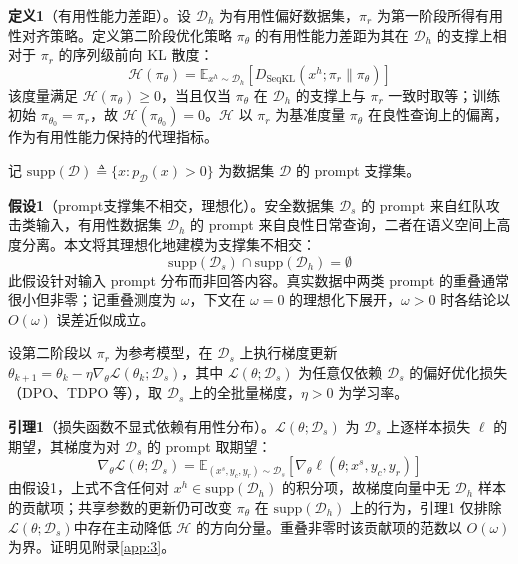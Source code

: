 \documentclass[lettersize,journal]{IEEEtran}
\begin{document}
\textbf{定义1}（有用性能力差距）。设 $\mathcal{D}_h$ 为有用性偏好数据集，$\pi_r$ 为第一阶段所得有用性对齐策略。定义第二阶段优化策略 $\pi_\theta$ 的有用性能力差距为其在 $\mathcal{D}_h$ 的支撑上相对于 $\pi_r$ 的序列级前向 KL 散度：
\begin{equation}
    \mathcal{H}(\pi_\theta) = \mathbb{E}_{x^h \sim \mathcal{D}_h}
    \left[ D_{\mathrm{SeqKL}}\left(x^h; \pi_r \| \pi_\theta \right) \right]
\end{equation}
该度量满足 $\mathcal{H}(\pi_\theta) \geq 0$，当且仅当 $\pi_\theta$ 在 $\mathcal{D}_h$ 的支撑上与 $\pi_r$ 一致时取等；训练初始 $\pi_{\theta_0} = \pi_r$，故 $\mathcal{H}(\pi_{\theta_0}) = 0$。$\mathcal{H}$ 以 $\pi_r$ 为基准度量 $\pi_\theta$ 在良性查询上的偏离，作为有用性能力保持的代理指标。

记 $\mathrm{supp}(\mathcal{D}) \triangleq \{x : p_\mathcal{D}(x) > 0\}$ 为数据集 $\mathcal{D}$ 的 prompt 支撑集。

\textbf{假设1}\label{jiashe1}（prompt支撑集不相交，理想化）。安全数据集 $\mathcal{D}_s$ 的 prompt 来自红队攻击类输入，有用性数据集 $\mathcal{D}_h$ 的 prompt 来自良性日常查询，二者在语义空间上高度分离。本文将其理想化地建模为支撑集不相交：
\begin{equation}
    \mathrm{supp}(\mathcal{D}_s) \cap \mathrm{supp}(\mathcal{D}_h) = \emptyset
\end{equation}
此假设针对输入 prompt 分布而非回答内容。真实数据中两类 prompt 的重叠通常很小但非零；记重叠测度为 $\omega$，下文在 $\omega = 0$ 的理想化下展开，$\omega > 0$ 时各结论以 $O(\omega)$ 误差近似成立。

设第二阶段以 $\pi_r$ 为参考模型，在 $\mathcal{D}_s$ 上执行梯度更新 $\theta_{k+1} = \theta_k - \eta \nabla_\theta \mathcal{L}(\theta_k; \mathcal{D}_s)$，其中 $\mathcal{L}(\theta; \mathcal{D}_s)$ 为任意仅依赖 $\mathcal{D}_s$ 的偏好优化损失（DPO、TDPO 等），取 $\mathcal{D}_s$ 上的全批量梯度，$\eta > 0$ 为学习率。

\textbf{引理1}\label{gradient1}（损失函数不显式依赖有用性分布）。$\mathcal{L}(\theta; \mathcal{D}_s)$ 为 $\mathcal{D}_s$ 上逐样本损失 $\ell$ 的期望，其梯度为对 $\mathcal{D}_s$ 的 prompt 取期望：
\begin{equation}
    \nabla_\theta \mathcal{L}(\theta; \mathcal{D}_s) = 
    \mathbb{E}_{(x^s, y_c, y_r) \sim \mathcal{D}_s}
    \left[\nabla_\theta \ell\left(\theta; x^s, y_c, y_r\right)\right]
\end{equation}
由假设1，上式不含任何对 $x^h \in \mathrm{supp}(\mathcal{D}_h)$ 的积分项，故梯度向量中无 $\mathcal{D}_h$ 样本的贡献项；共享参数的更新仍可改变 $\pi_\theta$ 在 $\mathrm{supp}(\mathcal{D}_h)$ 上的行为，引理1 仅排除$\mathcal{L}(\theta;\mathcal{D}_s)$中存在主动降低 $\mathcal{H}$ 的方向分量。重叠非零时该贡献项的范数以 $O(\omega)$ 为界。证明见附录\ref{app:3}。
\end{document}
